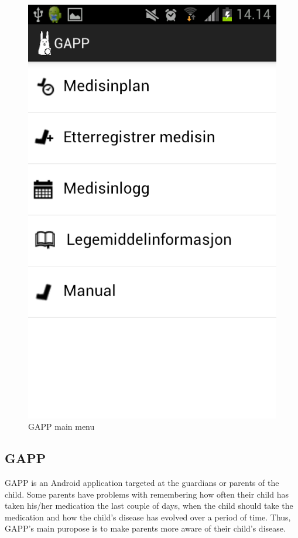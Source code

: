 \begin{figure}[H]
\begin{minipage}[b]{0.4\linewidth}
		\includegraphics[width=0.20\paperwidth]{Pictures/app-screenshots/gapp_main_menu.png}
		\caption{GAPP main menu}
		\label{fig:gapp-main-menu1}
	\end{minipage}
\end{figure}


\subsection{GAPP}
\label{sec:description-gapp}
GAPP is an Android application targeted at the guardians or parents of the child. 
Some parents have problems with remembering how often their child has taken his/her medication the last couple of days, when the child should take the medication and how the child's disease has evolved over a period of time. Thus, GAPP's main puropose is to make parents more aware of their child's disease.   


